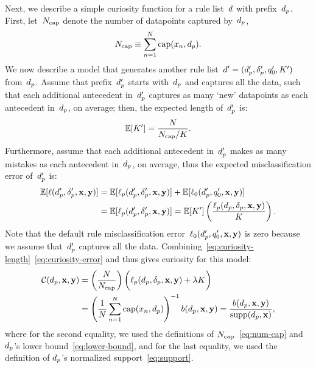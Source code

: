 Next, we describe a simple curiosity function for a rule list~${d}$ with prefix~$d_p$.
%
First, let~$N_{\textnormal{cap}}$ denote the number of datapoints captured by~$d_p$, \ie
\begin{align}
N_{\textnormal{cap}} \equiv \sum_{n=1}^N \textnormal{cap}(x_n, d_p).
\label{eq:num-cap}
\end{align}
We now describe a model that generates another
rule list~${{d}' = (d_p', \delta_p', q_0', K')}$ from~$d_p$.
%
Assume that prefix~$d_p'$ starts with~$d_p$ and captures all the data,
such that each additional antecedent in~$d_p'$
captures as many `new' datapoints as each antecedent in~$d_p$, on average;
then, the expected length of~$d_p'$ is:
\begin{align}
\mathbb{E}[ K' ] = \frac{N}{N_{\textnormal{cap}} / K}.
\label{eq:curiosity-length}
\end{align}
Furthermore, assume that each additional antecedent in~$d_p'$
makes as many mistakes as each antecedent in~$d_p$, on average,
thus the expected misclassification error of~$d_p'$ is:
\begin{align}
\mathbb{E}[\ell(d_p', \delta_p', \mathbf{x}, \mathbf{y})]
&= \mathbb{E}[\ell_p(d_p', \delta_p', \mathbf{x}, \mathbf{y})] + \mathbb{E}[\ell_0(d_p', q_0', \mathbf{x}, \mathbf{y})] \nonumber \\
&= \mathbb{E}[\ell_p(d_p', \delta_p', \mathbf{x}, \mathbf{y})]
=  \mathbb{E}[ K' ] \left(\frac{\ell_p(d_p, \delta_p, \mathbf{x}, \mathbf{y})}{K}\right).
\label{eq:curiosity-error}
\end{align}
Note that the default rule misclassification error~$\ell_0(d_p', q_0', \mathbf{x}, \mathbf{y})$
is zero because we assume that~$d_p'$ captures all the data.
%
Combining~\eqref{eq:curiosity-length}~\eqref{eq:curiosity-error} and thus gives
curiosity for this model:
\begin{align*}
\mathcal{C}(d_p, \mathbf{x}, \mathbf{y})
&= \left( \frac{N}{N_{\textnormal{cap}}} \right) \biggl(\ell_p(d_p, \delta_p, \mathbf{x}, \mathbf{y}) + {\lambda} K \biggr) \\
&= \left( \frac{1}{N} \sum_{n=1}^N \textnormal{cap}(x_n, d_p) \right)^{-1} b(d_p, \mathbf{x}, \mathbf{y})
= \frac{b(d_p, \mathbf{x}, \mathbf{y})}{\textnormal{supp}(d_p, \mathbf{x})},
\end{align*}
where for the second equality, we used the definitions of $N_{\textnormal{cap}}$~\eqref{eq:num-cap}
and $d_p$'s lower bound~\eqref{eq:lower-bound}, and for the last equality,
we used the definition of $d_p$'s normalized support~\eqref{eq:support}.

